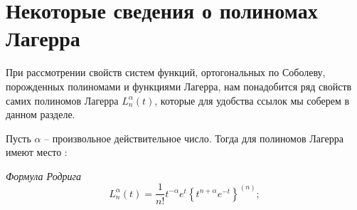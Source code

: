 
\section{Некоторые сведения о полиномах Лагерра}
При рассмотрении свойств систем функций, ортогональных по Соболеву, порожденных полиномами и функциями Лагерра, нам понадобится ряд свойств самих полиномов Лагерра $L_n^\alpha(t)$, которые для удобства ссылок мы соберем в данном разделе.

Пусть $\alpha$ -- произвольное действительное число. Тогда для полиномов Лагерра  имеют место \cite{Sege}:

\textit{Формула Родрига}
\begin{equation}\label{lag-2.1}
L_n^{\alpha}(t) = \frac{1}{n!}t^{-\alpha}e^{t} \left\{ t^{n+\alpha} e^{-t} \right\}^{(n)};
\end{equation}

